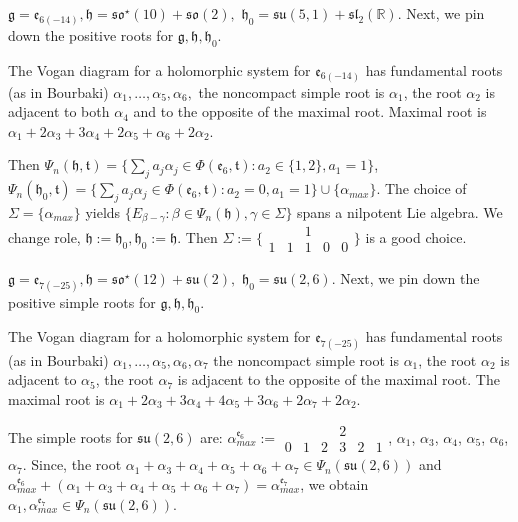 \documentclass[12pt]{amsart}
\theoremstyle{definition}
\theoremstyle{remark}
\newcommand{\e}{\mathfrak{e}}
\newcommand{\g}{\mathfrak{g}}
\newcommand{\h}{\mathfrak{h}}
\renewcommand{\t}{{\mathfrak t}}
\newcommand{\R}{{\mathbb R}}
\numberwithin{equation}{section}
\begin{document}
\smallskip

 $\g=\mathfrak e_{6(-14)},  \h=\mathfrak{so}^\star(10)+\mathfrak {so}(2), $
     $  \h_0 = \mathfrak {su}(5,1) +\mathfrak{sl}_2(\R)  $. Next, we pin down the positive roots for $\g, \h, \h_0$.

  The Vogan diagram for a holomorphic system for $\mathfrak e_{6(-14)}$ has fundamental roots (as in Bourbaki) $\alpha_1, \dots, \alpha_5, \alpha_6, $  the noncompact simple root is $\alpha_1$, the root $\alpha_2$ is  adjacent to both $\alpha_4$ and to the opposite of the maximal root. Maximal root is $\alpha_1 +2\alpha_3 +3 \alpha_4+2 \alpha_5+\alpha_6 +2\alpha_2$.



\noindent
 Then   $\Psi_n(\h ,\t)=\{  \sum_j a_j \alpha_j \in \Phi(\mathfrak e_6,\mathfrak t) :  a_2 \in \{1,2\}, a_1=1\}$, $ \Psi_n(\h_0,  \t)=\{  \sum_j a_j \alpha_j \in \Phi(\mathfrak e_6,\mathfrak t) :  a_2=0, a_1=1 \}\cup \{\alpha_{max} \}$. The choice of $\Sigma=\{\alpha_{max} \}$    yields $\{E_{\beta -\gamma} : \beta \in \Psi_n(\h), \gamma \in \Sigma\}$ spans a nilpotent Lie algebra. We change role, $\h :=\h_0, \h_0 :=\h
 $. Then $\Sigma:=\{ \begin{smallmatrix}
    &   & 1 &   &   \\
  1& 1 & 1 & 0 & 0
\end{smallmatrix}\} $ is a good choice.


\smallskip

\smallskip

 $\g=\mathfrak e_{7(-25)},  \h=\mathfrak{so}^\star(12)+\mathfrak {su}(2), $
     $  \h_0 = \mathfrak {su}(2,6)   $. Next, we pin down the positive simple roots for $\g, \h, \h_0$.

  The Vogan diagram for a holomorphic system for $\mathfrak e_{7(-25)}$ has fundamental roots (as in Bourbaki) $\alpha_1, \dots, \alpha_5, \alpha_6,  \alpha_7$  the noncompact simple root is $\alpha_1$, the root $\alpha_2$ is  adjacent to  $\alpha_5$, the root $\alpha_7$ is  adjacent to the opposite of the maximal root. The maximal root is $\alpha_1 +2\alpha_3 +3 \alpha_4+4 \alpha_5+3\alpha_6 +2\alpha_7 +2\alpha_2$.


The simple roots for  $    \mathfrak {su}(2,6)   $ are: $ \alpha_{max}^{\e_6} := \begin{smallmatrix}
   & &   & 2 &   &   \\
  0&1& 2& 3 & 2 & 1
\end{smallmatrix} $, $\alpha_1$, $\alpha_3$, $\alpha_4$, $\alpha_5$, $\alpha_6$, $\alpha_7$.
Since, the  root $\alpha_1+\alpha_3+\alpha_4+\alpha_5+\alpha_6+\alpha_7 \in \Psi_n(\mathfrak {su}(2,6))$ and $\alpha_{max}^{\e_6} + (\alpha_1+\alpha_3+\alpha_4+\alpha_5+\alpha_6+\alpha_7)=\alpha_{max}^{\e_7}$, we obtain $\alpha_1, \alpha_{max}^{\e_7} \in \Psi_n(\mathfrak {su}(2,6))$.
\end{document}
